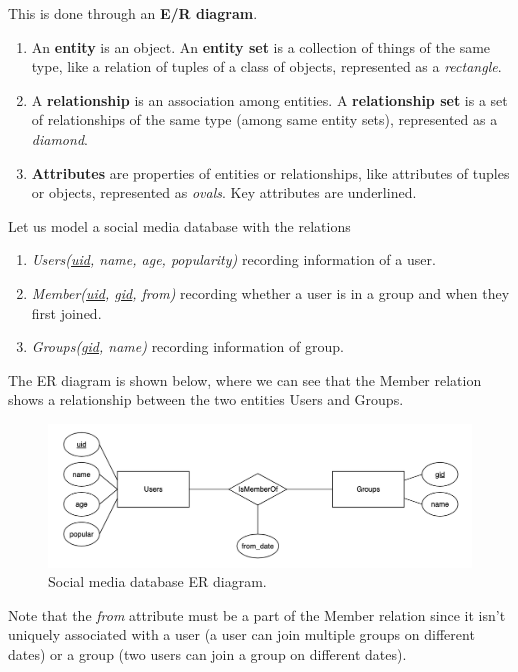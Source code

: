 \documentclass{article}
\begin{document}
    \begin{definition}
      This is done through an \textbf{E/R diagram}. 
      \begin{enumerate}
        \item An \textbf{entity} is an object. An \textbf{entity set} is a collection of things of the same type, like a relation of tuples of a class of objects, represented as a \textit{rectangle}. 
        \item A \textbf{relationship} is an association among entities. A \textbf{relationship set} is a set of relationships of the same type (among same entity sets), represented as a \textit{diamond}. 
        \item \textbf{Attributes} are properties of entities or relationships, like attributes of tuples or objects, represented as \textit{ovals}. Key attributes are underlined. 
      \end{enumerate}
    \end{definition}

    \begin{example}[E/R Diagram]
      Let us model a social media database with the relations 
      \begin{enumerate}
        \item \textit{Users(\underline{uid}, name, age, popularity)} recording information of a user. 
        \item \textit{Member(\underline{uid}, \underline{gid}, from)} recording whether a user is in a group and when they first joined. 
        \item \textit{Groups(\underline{gid}, name)} recording information of group. 
      \end{enumerate}
      The ER diagram is shown below, where we can see that the Member relation shows a relationship between the two entities Users and Groups. 

      \begin{figure}[H]
        \centering 
        \includegraphics[scale=0.2]{img/social_media.png}
        \caption{Social media database ER diagram.} 
        \label{fig:social_media}
      \end{figure}

      Note that the \textit{from} attribute must be a part of the Member relation since it isn't uniquely associated with a user (a user can join multiple groups on different dates) or a group (two users can join a group on different dates). 
    \end{example}
\end{document}
